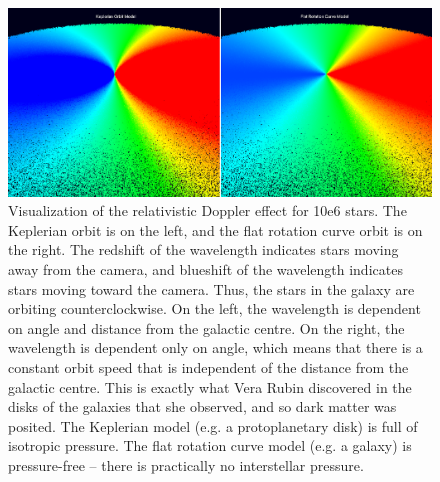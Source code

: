 \documentclass[12pt]{article}
\begin{document}
\begin{figure} 
\centering
\label{fig6}
  \includegraphics[width = 7 in]{doppler.png}
  \caption{
Visualization of the relativistic Doppler effect for 10e6 stars.
The Keplerian orbit is on the left, and the flat rotation curve orbit is on the right.
The redshift of the wavelength indicates stars moving away from the camera, and blueshift of the wavelength indicates stars moving toward the camera.
Thus, the stars in the galaxy are orbiting counterclockwise.
On the left, the wavelength is dependent on angle and distance from the galactic centre.
On the right, the wavelength is dependent only on angle, which means that there is a constant orbit speed that is independent of the distance from the galactic centre.
This is exactly what Vera Rubin discovered in the disks of the galaxies that she observed, and so dark matter was posited.
The Keplerian model (e.g. a protoplanetary disk) is full of isotropic pressure.
The flat rotation curve model (e.g. a galaxy) is pressure-free -- there is practically no interstellar pressure.
}
\end{figure}
\end{document}
